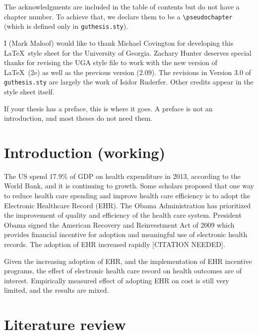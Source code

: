 \documentclass[12pt]{report}
\begin{document}
The acknowledgments are included in the table of contents but do
not have a chapter number.  To achieve that, we
declare them to be a \verb"\pseudochapter" (which is defined only in
\verb"guthesis.sty").

I (Mark Maloof) would like to thank Michael Covington for developing
this \LaTeX\ style sheet for the University of Georgia.
Zachary Hunter deserves special thanks for revising the UGA style
file to work with the new version of \LaTeX\ (2e) as well as the
previous version (2.09).
The revisions in
Version 3.0 of \verb"guthesis.sty" are
largely the work of Isidor Ruderfer.
Other credits appear in the style sheet itself.


If your thesis has a preface, this is where it goes.
A preface is not an introduction, and most theses do not need them.


\tableofcontents

\listoffigures  %
\listoftables   %

\newpage

\chapter{Introduction (working)}
The US spend 17.9\% of GDP on health expenditure in 2013, according to the World Bank, and it is continuing to growth. Some scholars proposed that one way to reduce health care spending and improve health care efficiency is to adopt the Electronic Healthcare Record (EHR). The Obama Administration has prioritized the improvement of quality and efficiency of the health care system. President Obama signed the American Recovery and Reinvestment Act of 2009 which provides financial incentive for adoption and meaningful use of electronic health records. The adoption of EHR increased rapidly [CITATION NEEDED].

Given the increasing adoption of EHR, and the implementation of EHR incentive programs, the effect of electronic health care record on health outcomes are of interest. Empirically measured effect of adopting EHR on cost is still very limited, and the results are mixed.

\chapter{Literature review}
\end{document}
